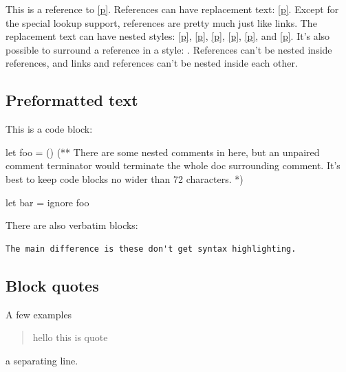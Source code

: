 This is a reference to \hyperref[Markup--val-foo]{[p\pageref*{Markup--val-foo}]}. References can have replacement text: \hyperref[Markup--val-foo]{[p\pageref*{Markup--val-foo}]}. Except for the special lookup support, references are pretty much just like links. The replacement text can have nested styles: \hyperref[Markup--val-foo]{[p\pageref*{Markup--val-foo}]}, \hyperref[Markup--val-foo]{[p\pageref*{Markup--val-foo}]}, \hyperref[Markup--val-foo]{[p\pageref*{Markup--val-foo}]}, \hyperref[Markup--val-foo]{[p\pageref*{Markup--val-foo}]}, \hyperref[Markup--val-foo]{[p\pageref*{Markup--val-foo}]}, and \hyperref[Markup--val-foo]{[p\pageref*{Markup--val-foo}]}. It's also possible to surround a reference in a style: . References can't be nested inside references, and links and references can't be nested inside each other.

\subsection{Preformatted text\label{Markup--preformatted-text}}%
This is a code block:\medbreak
\begin{ocamlcodeblock}
    let foo = ()
    (** There are some nested comments in here, but an unpaired comment
        terminator would terminate the whole doc surrounding comment. It's
        best to keep code blocks no wider than 72 characters. *)

    let bar =
      ignore foo
\end{ocamlcodeblock}\medbreak
There are also verbatim blocks:

\begin{verbatim}The main difference is these don't get syntax highlighting.\end{verbatim}%
\subsection{Block quotes\label{Markup--block-quotes}}%
A few examples

\begin{quote}
 hello this is quote
\end{quote}a separating line.

